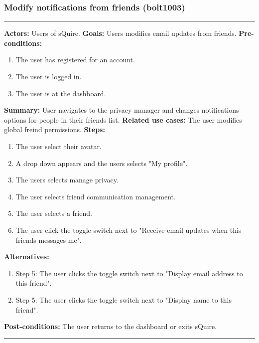 \documentclass[11pt]{report}
\begin{document}
\subsubsection{Modify notifications from friends (bolt1003)}
\vspace{2pt}
\hrule
\vspace{8pt}
 \textbf{Actors:} Users of sQuire. \newline
\textbf{Goals:} Users modifies email updates from friends. \newline
 \textbf{Pre-conditions:} \begin{enumerate}
  \item The user has registered for an account.
  \item The user is logged in.
  \item The user is at the dashboard.
 \end{enumerate}
 \textbf{Summary:} User navigates to the privacy manager and changes notifications options for people in their friends list.\newline
\textbf{Related use cases:} The user modifies global freind permissions. \newline
\textbf{Steps:} \begin{enumerate}
  \item The user select their avatar.
  \item A drop down appears and the users selects "My profile".
  \item The users selects manage privacy.
  \item The user selects friend communication management.
  \item The user selects a friend.
  \item The user click the toggle switch next to "Receive email updates when this friends messages me".
 \end{enumerate}
 \textbf{Alternatives:} \begin{enumerate}
  \item Step 5: The user clicks the toggle switch next to "Display email address to this friend".
  \item Step 5: The user clicks the toggle switch next to "Display name to this friend".
 \end{enumerate}
 \textbf{Post-conditions:} The user returns to the dashboard or exits sQuire. \newline
\vspace{8pt}
\hrule
\newpage
\end{document}
